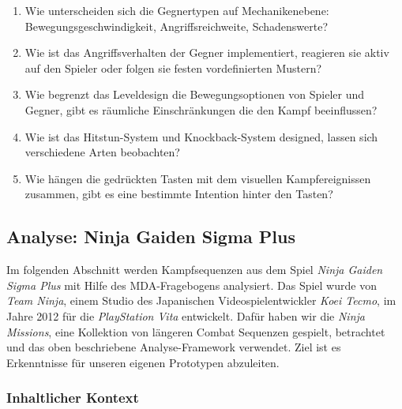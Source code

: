 \documentclass[../Main.tex]{subfiles}
\begin{document}
\begin{enumerate}[label=\textbf{M\arabic*}, leftmargin=1.5cm, itemsep=0.5em]
    \item Wie unterscheiden sich die Gegnertypen auf Mechanikenebene: Bewegungsgeschwindigkeit, Angriffsreichweite, Schadenswerte?
    \item Wie ist das Angriffsverhalten der Gegner implementiert, reagieren sie aktiv auf den Spieler oder folgen sie festen vordefinierten Mustern?
    \item Wie begrenzt das Leveldesign die Bewegungsoptionen von Spieler und Gegner, gibt es räumliche Einschränkungen die den Kampf beeinflussen?
    \item Wie ist das Hitstun-System und Knockback-System designed, lassen sich verschiedene Arten beobachten?
    \item Wie hängen die gedrückten Tasten mit dem visuellen Kampfereignissen zusammen, gibt es eine bestimmte Intention hinter den Tasten?
\end{enumerate}


\subsection{Analyse: Ninja Gaiden Sigma Plus} \label{sec:Referenzspielanalyse}

Im folgenden Abschnitt werden Kampfsequenzen aus dem Spiel \textit{Ninja Gaiden Sigma Plus} mit Hilfe des MDA-Fragebogens analysiert. Das Spiel wurde von \textit{Team Ninja}, einem Studio des Japanischen Videospielentwickler \textit{Koei Tecmo}, im Jahre 2012 für die \textit{PlayStation Vita} entwickelt.\autocite{wikipedia_ninjagaiden_2026} Dafür haben wir die \textit{Ninja Missions}, eine Kollektion von längeren Combat Sequenzen gespielt, betrachtet und das oben beschriebene Analyse-Framework verwendet. Ziel ist es Erkenntnisse für unseren eigenen Prototypen abzuleiten.

\subsubsection{Inhaltlicher Kontext}
\end{document}
